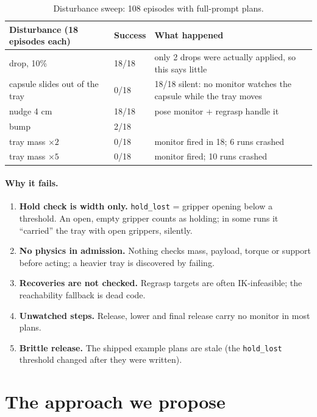 \documentclass[11pt,a4paper]{article}
\begin{document}
\begin{table}[h]
\centering\small
\begin{tabular}{@{}llp{8.3cm}@{}}
\toprule
Disturbance (18 episodes each) & Success & What happened\\
\midrule
drop, 10\% & 18/18 & only 2 drops were actually applied, so this says little\\
\rowcolor{bad} capsule slides out of the tray & 0/18 & 18/18 silent: no monitor watches the capsule while the tray moves\\
nudge 4 cm & 18/18 & pose monitor + regrasp handle it\\
\rowcolor{bad} bump & 2/18 & \\
\rowcolor{bad} tray mass $\times 2$ & 0/18 & monitor fired in 18; 6 runs crashed\\
\rowcolor{bad} tray mass $\times 5$ & 0/18 & monitor fired; 10 runs crashed\\
\bottomrule
\end{tabular}
\caption{Disturbance sweep: 108 episodes with full-prompt plans.}
\end{table}

\paragraph{Why it fails.}
\begin{enumerate}
\item \textbf{Hold check is width only.} \texttt{hold\_lost} = gripper opening below a threshold. An open, empty gripper counts as
holding; in some runs it ``carried'' the tray with open grippers, silently.
\item \textbf{No physics in admission.} Nothing checks mass, payload, torque or support before acting; a heavier tray is
discovered by failing.
\item \textbf{Recoveries are not checked.} Regrasp targets are often IK-infeasible; the reachability fallback is dead code.
\item \textbf{Unwatched steps.} Release, lower and final release carry no monitor in most plans.
\item \textbf{Brittle release.} The shipped example plans are stale (the \texttt{hold\_lost} threshold changed after they were written).
\end{enumerate}

\section{The approach we propose}
\end{document}
